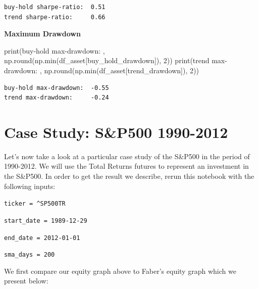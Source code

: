 \documentclass[
  letterpaper,
  DIV=11,
  numbers=noendperiod]{scrreprt}
\newenvironment{Shaded}{\begin{snugshade}}{\end{snugshade}}
\newcommand{\BuiltInTok}[1]{\textcolor[rgb]{0.00,0.23,0.31}{#1}}
\newcommand{\DecValTok}[1]{\textcolor[rgb]{0.68,0.00,0.00}{#1}}
\newcommand{\NormalTok}[1]{\textcolor[rgb]{0.00,0.23,0.31}{#1}}
\newcommand{\StringTok}[1]{\textcolor[rgb]{0.13,0.47,0.30}{#1}}
\begin{document}
\begin{verbatim}
buy-hold sharpe-ratio:  0.51
trend sharpe-ratio:     0.66
\end{verbatim}

\textbf{Maximum Drawdown}

\begin{Shaded}
\begin{Highlighting}[]
\BuiltInTok{print}\NormalTok{(}\StringTok{\textquotesingle{}buy{-}hold max{-}drawdown: \textquotesingle{}}\NormalTok{, np.}\BuiltInTok{round}\NormalTok{(np.}\BuiltInTok{min}\NormalTok{(df\_asset[}\StringTok{\textquotesingle{}buy\_hold\_drawdown\textquotesingle{}}\NormalTok{]), }\DecValTok{2}\NormalTok{))}
\BuiltInTok{print}\NormalTok{(}\StringTok{\textquotesingle{}trend max{-}drawdown:    \textquotesingle{}}\NormalTok{, np.}\BuiltInTok{round}\NormalTok{(np.}\BuiltInTok{min}\NormalTok{(df\_asset[}\StringTok{\textquotesingle{}trend\_drawdown\textquotesingle{}}\NormalTok{]), }\DecValTok{2}\NormalTok{))}
\end{Highlighting}
\end{Shaded}

\begin{verbatim}
buy-hold max-drawdown:  -0.55
trend max-drawdown:     -0.24
\end{verbatim}

\hypertarget{case-study-sp500-1990-2012}{%
\section{Case Study: S\&P500
1990-2012}\label{case-study-sp500-1990-2012}}

Let's now take a look at a particular case study of the S\&P500 in the
period of 1990-2012. We will use the Total Returns futures to represent
an investment in the S\&P500. In order to get the result we describe,
rerun this notebook with the following inputs:

\texttt{ticker\ =\ \textquotesingle{}\^{}SP500TR\textquotesingle{}}

\texttt{start\_date\ =\ \textquotesingle{}1989-12-29\textquotesingle{}}

\texttt{end\_date\ =\ \textquotesingle{}2012-01-01\textquotesingle{}}

\texttt{sma\_days\ =\ 200}

We first compare our equity graph above to Faber's equity graph which we
present below:
\end{document}

